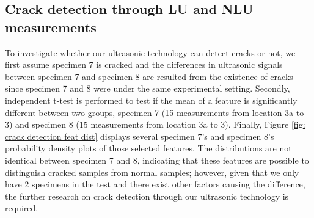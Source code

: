 \subsection{Crack detection through LU and NLU measurements}
To investigate whether our ultrasonic technology can detect cracks or not, we first assume specimen 7 is cracked and the differences in ultrasonic signals between specimen 7 and specimen 8 are resulted from the existence of cracks since specimen 7 and 8 were under the same experimental setting. Secondly, independent t-test is performed to test if the mean of a feature is significantly different between two groups, specimen 7 (15 measurements from location 3a to 3) and specimen 8 (15 measurements from location 3a to 3). Finally, Figure \ref{fig: crack detection feat dist} displays several specimen 7's and specimen 8's probability density plots of those selected features. The distributions are not identical between specimen 7 and 8, indicating that these features are possible to distinguish cracked samples from normal samples; however, given that we only have 2 specimens in the test and there exist other factors causing the difference, the further research on crack detection through our ultrasonic technology is required.

